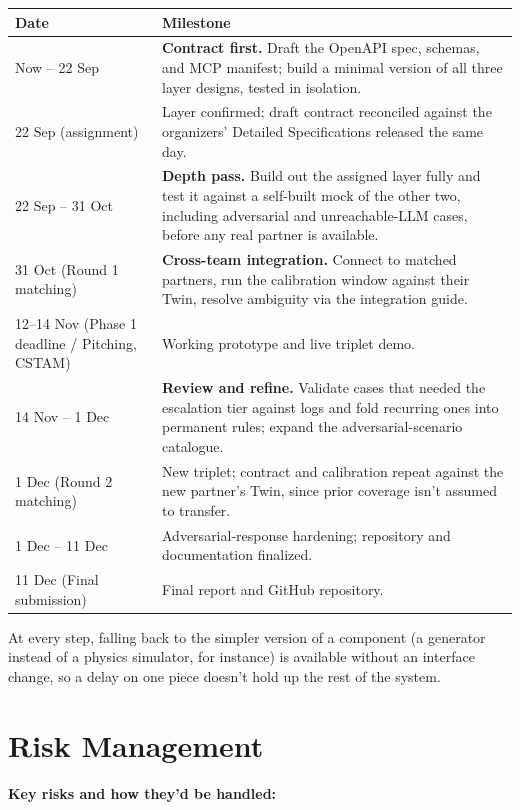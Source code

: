 \documentclass[10pt,letterpaper]{article}
\begin{document}
\begin{longtable}{p{1.9in} p{4.2in}}
\toprule
\textbf{Date} & \textbf{Milestone} \\
\midrule
\endhead
Now -- 22 Sep & \textbf{Contract first.} Draft the OpenAPI spec, schemas, and MCP manifest; build a minimal version of all three layer designs, tested in isolation. \\
22 Sep (assignment) & Layer confirmed; draft contract reconciled against the organizers' Detailed Specifications released the same day. \\
22 Sep -- 31 Oct & \textbf{Depth pass.} Build out the assigned layer fully and test it against a self-built mock of the other two, including adversarial and unreachable-LLM cases, before any real partner is available. \\
31 Oct (Round 1 matching) & \textbf{Cross-team integration.} Connect to matched partners, run the calibration window against their Twin, resolve ambiguity via the integration guide. \\
12--14 Nov (Phase 1 deadline / Pitching, CSTAM) & Working prototype and live triplet demo. \\
14 Nov -- 1 Dec & \textbf{Review and refine.} Validate cases that needed the escalation tier against logs and fold recurring ones into permanent rules; expand the adversarial-scenario catalogue. \\
1 Dec (Round 2 matching) & New triplet; contract and calibration repeat against the new partner's Twin, since prior coverage isn't assumed to transfer. \\
1 Dec -- 11 Dec & Adversarial-response hardening; repository and documentation finalized. \\
11 Dec (Final submission) & Final report and GitHub repository. \\
\bottomrule
\end{longtable}

At every step, falling back to the simpler version of a component (a generator instead of a physics simulator, for instance) is available without an interface change, so a delay on one piece doesn't hold up the rest of the system.

\section{Risk Management}

\textbf{Key risks and how they'd be handled:}
\end{document}

